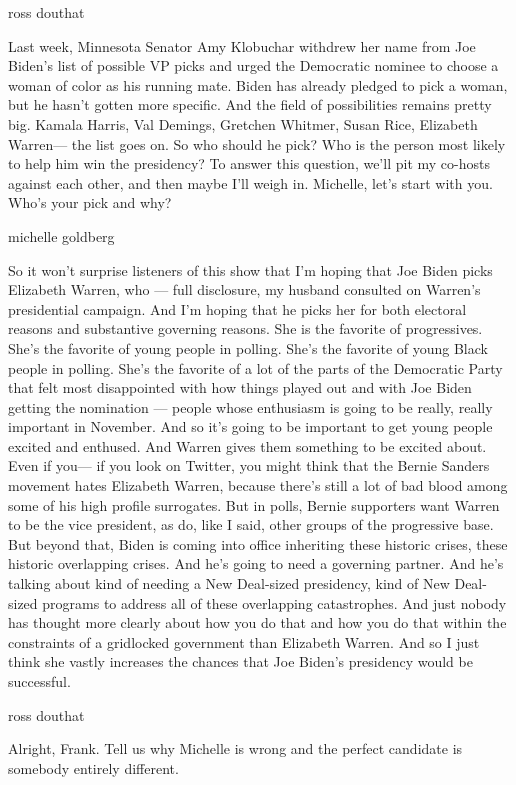 ross douthat

Last week, Minnesota Senator Amy Klobuchar withdrew her name from Joe
Biden's list of possible VP picks and urged the Democratic nominee to
choose a woman of color as his running mate. Biden has already pledged
to pick a woman, but he hasn't gotten more specific. And the field of
possibilities remains pretty big. Kamala Harris, Val Demings, Gretchen
Whitmer, Susan Rice, Elizabeth Warren--- the list goes on. So who should
he pick? Who is the person most likely to help him win the presidency?
To answer this question, we'll pit my co-hosts against each other, and
then maybe I'll weigh in. Michelle, let's start with you. Who's your
pick and why?

michelle goldberg

So it won't surprise listeners of this show that I'm hoping that Joe
Biden picks Elizabeth Warren, who --- full disclosure, my husband
consulted on Warren's presidential campaign. And I'm hoping that he
picks her for both electoral reasons and substantive governing reasons.
She is the favorite of progressives. She's the favorite of young people
in polling. She's the favorite of young Black people in polling. She's
the favorite of a lot of the parts of the Democratic Party that felt
most disappointed with how things played out and with Joe Biden getting
the nomination --- people whose enthusiasm is going to be really, really
important in November. And so it's going to be important to get young
people excited and enthused. And Warren gives them something to be
excited about. Even if you--- if you look on Twitter, you might think
that the Bernie Sanders movement hates Elizabeth Warren, because there's
still a lot of bad blood among some of his high profile surrogates. But
in polls, Bernie supporters want Warren to be the vice president, as do,
like I said, other groups of the progressive base. But beyond that,
Biden is coming into office inheriting these historic crises, these
historic overlapping crises. And he's going to need a governing partner.
And he's talking about kind of needing a New Deal-sized presidency, kind
of New Deal-sized programs to address all of these overlapping
catastrophes. And just nobody has thought more clearly about how you do
that and how you do that within the constraints of a gridlocked
government than Elizabeth Warren. And so I just think she vastly
increases the chances that Joe Biden's presidency would be successful.

ross douthat

Alright, Frank. Tell us why Michelle is wrong and the perfect candidate
is somebody entirely different.

